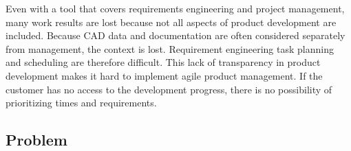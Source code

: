     Even with a tool that covers requirements engineering and project management, many work results are lost because not all aspects of product development are included. Because CAD data and documentation are often considered separately from management, the context is lost. 
    Requirement engineering task planning and scheduling are therefore difficult.
    This lack of transparency in product development makes it hard to implement agile product management. If the customer has no access to the development progress, there is no possibility of prioritizing times and requirements.
    
    \subsection*{Problem}

    







